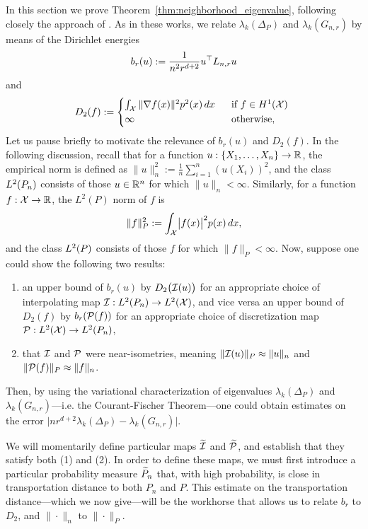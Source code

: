In this section we prove Theorem~\ref{thm:neighborhood_eigenvalue}, following closely the approach of \citet{burago2014,trillos2019,calder2019}. As in these works, we relate $\lambda_k(\Delta_P)$ and $\lambda_k(G_{n,r})$ by means of the Dirichlet energies
\begin{equation*}
b_r(u) := \frac{1}{n^2 r^{d+ 2}}u^{\top} L_{n,r} u 
\end{equation*}
and
\begin{equation*}
D_2(f) :=
\begin{cases*}
\int_{\Xset} \|\nabla f(x)\|^2 p^2(x) \,dx~~ &\textrm{if $f \in H^1(\Xset)$} \\
\infty~~ & \textrm{otherwise,}
\end{cases*}
\end{equation*}
Let us pause briefly to motivate the relevance of $b_r(u)$ and $D_2(f)$. In the following discussion, recall that for a function $u: \{X_1,\ldots,X_n\} \to \mathbb{R}$, the empirical norm is defined as $\|u\|_n^2 := \frac{1}{n} \sum_{i = 1}^{n} (u(X_i))^2$, and the class $L^2(P_n)$ consists of those $u \in \mathbb{R}^n$ for which $\|u\|_{n} < \infty$. Similarly, for a function $f: \mathcal{X} \to \mathbb{R}$, the $L^2(P)$ norm of $f$ is
\begin{equation*}
\|f\|_{P}^2 := \int_{\mathcal{X}} \bigl|f(x)\bigr|^2 p(x) \,dx,
\end{equation*} 
and the class $L^2(P)$ consists of those $f$ for which $\|f\|_P < \infty$. Now, suppose one could show the following two results: 
\begin{enumerate}[(1)]
	\item an upper bound of $b_r(u)$ by $D_2\bigl(\mathcal{I}(u)\bigr)$ for an appropriate choice of interpolating map $\mathcal{I}: L^2(P_n) \to L^2(\mathcal{X})$, and vice versa an upper bound of $D_2(f)$ by $b_r(\mathcal{P}(f))$ for an appropriate choice of discretization map $\mathcal{P}: L^2(\mathcal{X}) \to L^2(P_n)$,
	\item that $\mathcal{I}$ and $\mathcal{P}$ were near-isometries, meaning $\|\mathcal{I}(u)\|_{P} \approx \|u\|_{n}$ and $\|\mathcal{P}(f)\|_{P} \approx \|f\|_{n}$.
\end{enumerate}
Then, by using the variational characterization of eigenvalues $\lambda_k(\Delta_P)$ and $\lambda_k(G_{n,r})$---i.e. the Courant-Fischer Theorem---one could obtain estimates on the error $\bigl|nr^{d + 2}\lambda_k(\Delta_P) - \lambda_k(G_{n,r})\bigr|$.

We will momentarily define particular maps $\widetilde{\mathcal{I}}$ and $\widetilde{\mathcal{P}}$, and establish that they satisfy both (1) and (2). In order to define these maps, we must first introduce a particular probability measure $\widetilde{P}_n$ that, with high probability, is close in transportation distance to both $P_n$ and $P$. This estimate on the transportation distance---which we now give---will be the workhorse that allows us to relate $b_r$ to $D_2$, and $\|\cdot\|_n$ to $\|\cdot\|_P$.


